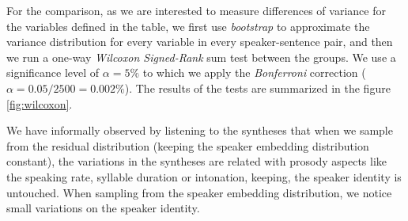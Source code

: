 For the comparison, as we are interested to measure differences of variance for the variables defined in the table, we first use \textit{bootstrap} to approximate the variance distribution for every variable in every speaker-sentence pair, and then we run a one-way \textit{Wilcoxon Signed-Rank} sum test between the groups. We use a significance level of $\alpha=5\%$ to which we apply the \textit{Bonferroni} correction ($\alpha=0.05/2500=0.002\%$). The results of the tests are summarized in the figure \ref{fig:wilcoxon}.

We have informally observed by listening to the syntheses that when we sample from the residual distribution (keeping the speaker embedding distribution constant), the variations in the syntheses are related with prosody aspects like the speaking rate, syllable duration or intonation, keeping, the speaker identity is untouched. When sampling from the speaker embedding distribution, we notice small variations on the speaker identity.



